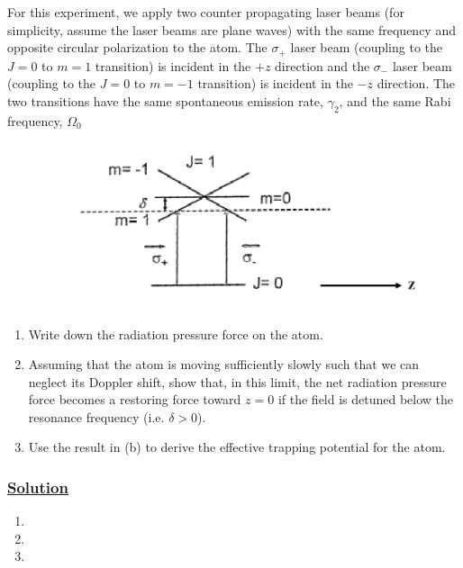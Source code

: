 \documentclass[12pt]{article}
\begin{document}
For this experiment, we apply two counter propagating laser beams (for simplicity, assume the laser beams are plane waves) with the same frequency and opposite circular polarization to the atom.
The $\sigma_+$ laser beam (coupling to the $J=0$ to $m=1$ transition) is incident in the $+z$ direction and the $\sigma_-$ laser beam (coupling to the $J=0$ to $m=-1$ transition) is incident in the $-z$ direction.
The two transitions have the same spontaneous emission rate, $\gamma_2$, and the same Rabi frequency, $\Omega_0$
\begin{figure}[h]
    \centering
    \includegraphics[scale=.75]{polarized_beams.png}
\end{figure}
\begin{enumerate}[label=(\alph*)]
    \item Write down the radiation pressure force on the atom.
    \item Assuming that the atom is moving sufficiently slowly such that we can neglect its Doppler shift, show that, in this limit, the net radiation pressure force becomes a restoring force toward $z=0$ if the field is detuned below the resonance frequency (i.e. $\delta>0$).
    \item Use the result in (b) to derive the effective trapping potential for the atom.
\end{enumerate}

\subsubsection*{\underline{Solution}}
\begin{enumerate}[label=(\alph*)]
    \item
    \item 
    \item 
\end{enumerate}

%
\end{document}
